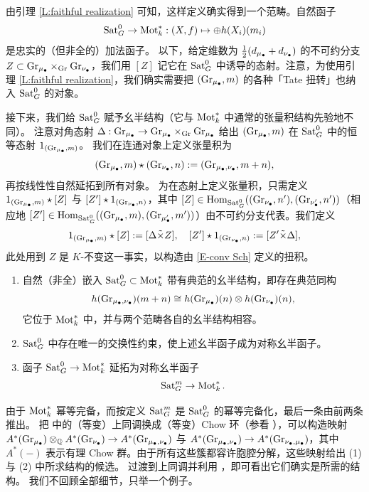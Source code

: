 由引理 \ref{L:faithful realization} 可知，这样定义确实得到一个范畴。自然函子
$$\operatorname{Sat}_G^0\to \operatorname{Mot}_k^*: (X,f)\mapsto \oplus h(X_i)(m_i)$$
是忠实的（但非全的）加法函子。
以下，给定维数为 $\frac{1}{2}(d_{{\mu_\bullet}}+d_{\nu_\bullet})$ 的不可约分支 $Z\subset {\operatorname{Gr}}_{{\mu_\bullet}}\times_{\operatorname{Gr}}{\operatorname{Gr}}_{\nu_\bullet}$，我们用 $[Z]$ 记它在 $\operatorname{Sat}^0_G$ 中诱导的态射。注意，为使用引理 \ref{L:faithful realization}，我们确实需要把 $({\operatorname{Gr}}_{\mu_\bullet},m)$ 的各种「Tate 扭转」也纳入 $\operatorname{Sat}^0_G$ 的对象。

接下来，我们给 $\operatorname{Sat}_G^{0}$ 赋予幺半结构（它与 $\operatorname{Mot}_k^*$ 中通常的张量积结构先验地不同）。
注意对角态射 $\Delta: {\operatorname{Gr}}_{{\mu_\bullet}}\to {\operatorname{Gr}}_{{\mu_\bullet}}\times_{{\operatorname{Gr}}}{\operatorname{Gr}}_{{\mu_\bullet}}$ 给出 $({\operatorname{Gr}}_{\mu_\bullet},m)$ 在 $\operatorname{Sat}_G^{0}$ 中的恒等态射 $1_{({\operatorname{Gr}}_{\mu_\bullet},m)}$。
我们在连通对象上定义张量积为
\[({\operatorname{Gr}}_{{\mu_\bullet}},m)\star ({\operatorname{Gr}}_{\nu_\bullet},n):=({\operatorname{Gr}}_{{\mu_\bullet},\nu_\bullet},m+n),\]
再按线性性自然延拓到所有对象。
为在态射上定义张量积，只需定义 $1_{({\operatorname{Gr}}_{{\mu_\bullet}},m)}\star [Z]$ 与 $[Z']\star 1_{({\operatorname{Gr}}_{\nu_\bullet},n)}$，其中 $[Z]\in {\operatorname{Hom}}_{\operatorname{Sat}_G^{0}}(({\operatorname{Gr}}_{\nu_\bullet},n'), ({\operatorname{Gr}}_{\nu'_\bullet},n'))$（相应地 $[Z'] \in {\operatorname{Hom}}_{\operatorname{Sat}_G^{0}}(({\operatorname{Gr}}_{\mu_\bullet},m), ({\operatorname{Gr}}_{\mu'_\bullet},m'))$）由不可约分支代表。我们定义
$$1_{({\operatorname{Gr}}_{{\mu_\bullet}},m)}\star [Z]:=[\Delta\tilde\times Z],\quad [Z']\star 1_{({\operatorname{Gr}}_{\nu_\bullet},n)}:=[Z'\tilde\times\Delta],$$
此处用到 $Z$ 是 $K$-不变这一事实，以构造由 \eqref{E-conv Sch} 定义的扭积。

\begin{lem}
\begin{enumerate}
\item 自然（非全）嵌入 $\operatorname{Sat}_G^0\subset\operatorname{Mot}_k^*$ 带有典范的幺半结构，即存在典范同构
\[h({\operatorname{Gr}}_{{\mu_\bullet},\nu_\bullet})(m+n)\cong h({\operatorname{Gr}}_{{\mu_\bullet}})(n)\otimes h({\operatorname{Gr}}_{\nu_\bullet})(n),\]
它位于 $\operatorname{Mot}^*_k$ 中，并与两个范畴各自的幺半结构相容。
\item $\operatorname{Sat}_G^{0}$ 中存在唯一的交换性约束，使上述幺半函子成为对称幺半函子。
\item 函子 $\operatorname{Sat}_G^0\to\operatorname{Mot}^*_k$ 延拓为对称幺半函子
$$\operatorname{Sat}_G^m\to \operatorname{Mot}_k^*.$$
\end{enumerate}
\end{lem}

由于 $\operatorname{Mot}^*_k$ 幂等完备，而按定义 $\operatorname{Sat}_G^m$ 是 $\operatorname{Sat}_G^0$ 的幂等完备化，最后一条由前两条推出。
把 \cite[\S 2.3, \S 2.4]{Zh1} 中的（等变）上同调换成（等变）Chow 环（参看 \cite{EG}），可以构造映射 $A^*({\operatorname{Gr}}_{{\mu_\bullet}})\otimes_{{\mathbb Q}}A^*({\operatorname{Gr}}_{\nu_\bullet})\to A^*({\operatorname{Gr}}_{{\mu_\bullet},\nu_\bullet})$ 与 $A^*({\operatorname{Gr}}_{{\mu_\bullet},\nu_\bullet})\to A^*({\operatorname{Gr}}_{\nu_\bullet,{\mu_\bullet}})$，其中 $A^*(-)$ 表示有理 Chow 群。由于所有这些簇都容许胞腔分解，这些映射给出 (1) 与 (2) 中所求结构的候选。
过渡到上同调并利用 \cite[\S 2.3, \S 2.4]{Zh1}，即可看出它们确实是所需的结构。
我们不回顾全部细节，只举一个例子。

